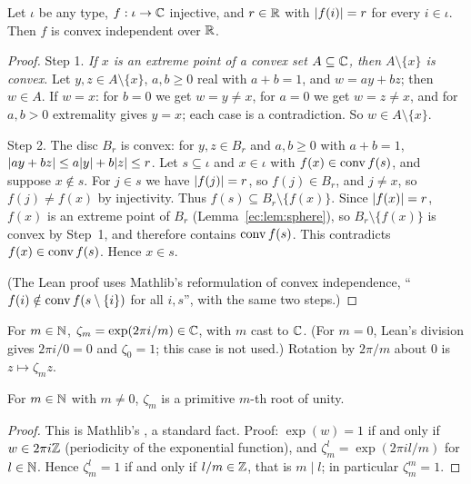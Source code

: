 \begin{lemma}\label{ec:lem:ci-circle}
Let $\iota$ be any type, $f:\iota\to\mathbb C$ injective, and $r\in\mathbb R$ with $\lvert f(i)\rvert=r$ for every $i\in\iota$. Then $f$ is
convex independent over $\mathbb R$.
\end{lemma}

\begin{proof}
Step 1. \emph{If $x$ is an extreme point of a convex set $A\subseteq\mathbb C$, then $A\setminus\{x\}$ is convex.} Let
$y,z\in A\setminus\{x\}$, $a,b\ge0$ real with $a+b=1$, and $w=ay+bz$; then $w\in A$. If $w=x$: for $b=0$ we get
$w=y\ne x$, for $a=0$ we get $w=z\ne x$, and for $a,b>0$ extremality gives $y=x$; each case is a contradiction. So
$w\in A\setminus\{x\}$.

Step 2. The disc $B_r$ is convex: for $y,z\in B_r$ and $a,b\ge0$ with $a+b=1$, $\lvert ay+bz\rvert\le a\lvert y\rvert+b\lvert z\rvert\le r$. Let $s\subseteq\iota$ and $x\in\iota$ with $f(x)\in\operatorname{conv} f(s)$, and suppose $x\notin s$. For $j\in s$ we have
$\lvert f(j)\rvert=r$, so $f(j)\in B_r$, and $j\ne x$, so $f(j)\ne f(x)$ by injectivity. Thus $f(s)\subseteq
B_r\setminus\{f(x)\}$. Since $\lvert f(x)\rvert=r$, $f(x)$ is an extreme point of $B_r$ (Lemma~\ref{ec:lem:sphere}), so
$B_r\setminus\{f(x)\}$ is convex by Step~1, and therefore contains $\operatorname{conv} f(s)$. This contradicts $f(x)\in\operatorname{conv} f(s)$.
Hence $x\in s$.

(The Lean proof uses Mathlib's reformulation of convex independence, ``$f(i)\notin\operatorname{conv} f(s\setminus\{i\})$ for all
$i,s$'', with the same two steps.)
\end{proof}

\begin{definition}\label{ec:def:zeta}
For $m\in\mathbb N$, $\zeta_m=\exp(2\pi i/m)\in\mathbb C$, with $m$ cast to $\mathbb C$. (For $m=0$, Lean's division gives $2\pi i/0=0$ and
$\zeta_0=1$; this case is not used.) Rotation by $2\pi/m$ about $0$ is $z\mapsto\zeta_mz$.
\end{definition}

\begin{lemma}\label{ec:lem:zeta}
For $m\in\mathbb N$ with $m\ne0$, $\zeta_m$ is a primitive $m$-th root of unity.
\end{lemma}

\begin{proof}
This is Mathlib's , a standard fact. Proof: $\exp(w)=1$ if and only if
$w\in2\pi i\mathbb Z$ (periodicity of the exponential function), and $\zeta_m^l=\exp(2\pi il/m)$ for $l\in\mathbb N$. Hence
$\zeta_m^l=1$ if and only if $l/m\in\mathbb Z$, that is $m\mid l$; in particular $\zeta_m^m=1$.
\end{proof}

